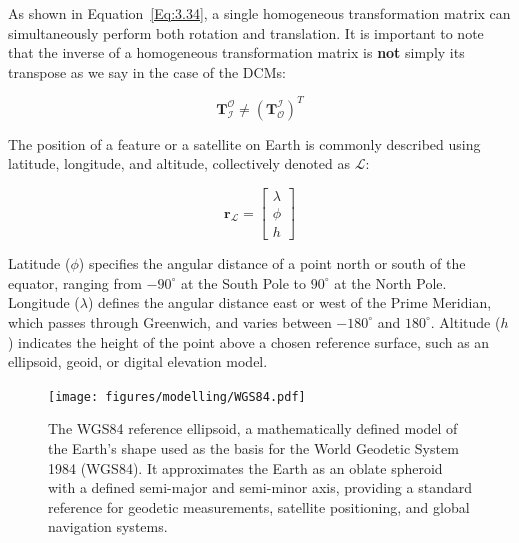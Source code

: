 \noindent 
As shown in Equation~\ref{Eq:3.34}, a single homogeneous transformation matrix can simultaneously perform both rotation and translation. It is important to note that the inverse of a homogeneous transformation matrix is \textbf{not} simply its transpose as we say in the case of the DCMs:

\begin{equation}
    \mathbf{T}_\mathcal{I}^\mathcal{O} \neq \left( \mathbf{T}_\mathcal{O}^\mathcal{I} \right)^T
\end{equation}


The position of a feature or a satellite on Earth is commonly described using latitude, longitude, and altitude, collectively denoted as $\mathcal{L}$:

\begin{equation}
    \mathbf{r}_\mathcal{L} = 
    \begin{bmatrix}
        \lambda \\ 
        \phi \\ 
        h
    \end{bmatrix}
\end{equation}

\noindent Latitude ($\phi$) specifies the angular distance of a point north or south of the equator, ranging from $-90^\circ$ at 
the South Pole to $90^\circ$ at the North Pole. Longitude ($\lambda$) defines the angular distance east or west of the Prime Meridian, which passes 
through Greenwich, and varies between $-180^\circ$ and $180^\circ$. Altitude ($h$) indicates the height of the point above a chosen reference surface, 
such as an ellipsoid, geoid, or digital elevation model.

\begin{figure}[H]
    \centering
    \texttt{[image: figures/modelling/WGS84.pdf]}
    \caption{The WGS84 reference ellipsoid, a mathematically defined model of the Earth's shape used as the basis for the World Geodetic System 1984 (WGS84). It approximates the Earth as an oblate spheroid with a defined semi-major and semi-minor axis, providing a standard reference for geodetic measurements, satellite positioning, and global navigation systems.}
    \label{fig:WGS84}
\end{figure}

